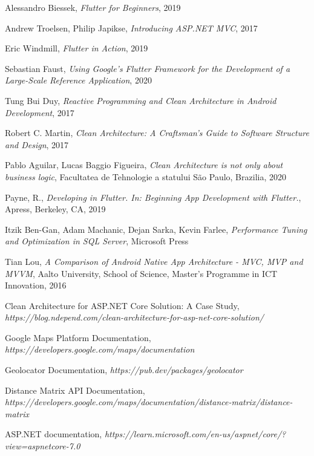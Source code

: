 \begin{thebibliography}{9}

Alessandro Biessek, \textit{Flutter for Beginners}, 2019

Andrew Troelsen, Philip Japikse, \textit{Introducing ASP.NET MVC}, 2017

Eric Windmill, \textit{Flutter in Action}, 2019

Sebastian Faust, \textit{Using Google's Flutter Framework for the Development of a Large-Scale Reference Application}, 2020

Tung Bui Duy, \textit{Reactive Programming and Clean Architecture in Android Development}, 2017

Robert C. Martin, \textit{Clean Architecture: A Craftsman's Guide to Software Structure and Design}, 2017

Pablo Aguilar, Lucas Baggio Figueira, \textit{Clean Architecture is not only about business logic}, Facultatea de Tehnologie a statului São Paulo, Brazilia, 2020

Payne, R., \textit{Developing in Flutter. In: Beginning App Development with Flutter.}, Apress, Berkeley, CA, 2019

Itzik Ben-Gan, Adam Machanic, Dejan Sarka, Kevin Farlee, \textit{Performance Tuning and Optimization in SQL Server}, Microsoft Press

Tian Lou, \textit{A Comparison of Android Native App Architecture - MVC, MVP and MVVM}, Aalto University, School of Science, Master's Programme in ICT Innovation, 2016

Clean Architecture for ASP.NET Core Solution: A Case Study, \newline \textit{https://blog.ndepend.com/clean-architecture-for-asp-net-core-solution/}

Google Maps Platform Documentation, \newline \textit{https://developers.google.com/maps/documentation}

Geolocator Documentation, \newline \textit{https://pub.dev/packages/geolocator}

Distance Matrix API Documentation, \newline \textit{https://developers.google.com/maps/documentation/distance-matrix/distance-matrix}

ASP.NET documentation, \newline \textit{https://learn.microsoft.com/en-us/aspnet/core/?view=aspnetcore-7.0}

\end{thebibliography}
